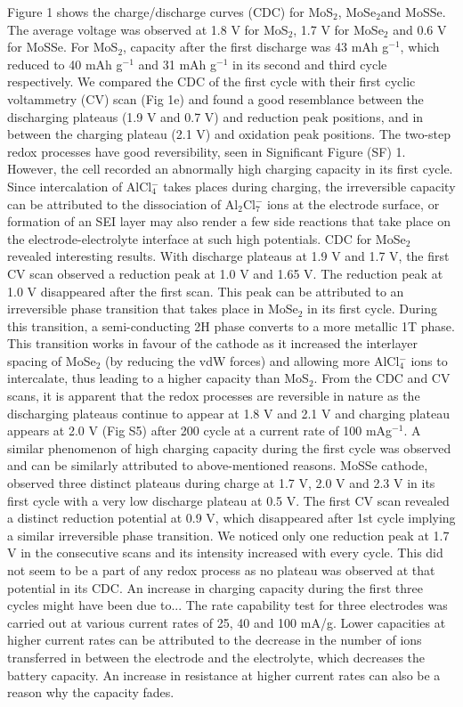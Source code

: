 \documentclass[num-refs]{wiley-article}
\begin{document}
Figure 1 shows the charge/discharge curves (CDC) for MoS$_2$, MoSe$_2$and MoSSe. The average voltage was observed at 1.8 V for MoS$_2$, 1.7 V for MoSe$_2$ and 0.6 V for MoSSe. For MoS$_2$, capacity after the first discharge was 43 mAh g$^{-1}$, which reduced to 40 mAh g$^{-1}$ and 31 mAh g$^{-1}$ in its second and third cycle respectively. We compared the CDC of the first cycle with their first cyclic voltammetry (CV) scan (Fig 1e) and found a good resemblance between the discharging plateaus (1.9 V and 0.7 V) and reduction peak positions, and in between the charging plateau (2.1 V) and oxidation peak positions. The two-step redox processes have good reversibility, seen in Significant Figure (SF) 1. However, the cell recorded an abnormally high charging capacity in its first cycle. Since intercalation of AlCl$_4^-$ takes places during charging, the irreversible capacity can be attributed to the dissociation of Al$_2$Cl$_7^-$ ions at the electrode surface, or formation of an SEI layer may also render a few side reactions that take place on the electrode-electrolyte interface at such high potentials. CDC for MoSe$_2$ revealed interesting results. With discharge plateaus at 1.9 V and 1.7 V, the first CV scan observed a reduction peak at 1.0 V and 1.65 V. The reduction peak at 1.0 V disappeared after the first scan. This peak can be attributed to an irreversible phase transition that takes place in MoSe$_2$ in its first cycle\cite{fan_hybrid_2017}. During this transition, a semi-conducting 2H phase converts to a more metallic 1T phase.  This transition works in favour of the cathode as it increased the interlayer spacing of MoSe$_2$ (by reducing the vdW forces) and allowing more AlCl$_4^-$ ions to intercalate, thus leading to a higher capacity than MoS$_2$. From the CDC and CV scans, it is apparent that the redox processes are reversible in nature as the discharging plateaus continue to appear at 1.8 V and 2.1 V and charging plateau appears at 2.0 V (Fig S5) after 200 cycle at a current rate of 100 mAg$^{-1}$. A similar phenomenon of high charging capacity during the first cycle was observed and can be similarly attributed to above-mentioned reasons. MoSSe cathode, observed three distinct plateaus during charge at 1.7 V, 2.0 V and 2.3 V in its first cycle with a very low discharge plateau at 0.5 V. The first CV scan revealed a distinct reduction potential at 0.9 V, which disappeared after 1st cycle implying a similar irreversible phase transition. We noticed only one reduction peak at 1.7 V in the consecutive scans and its intensity increased with every cycle. This did not seem to be a part of any redox process as no plateau was observed at that potential in its CDC. An increase in charging capacity during the first three cycles might have been due to... The rate capability test for three electrodes was carried out at various current rates of 25, 40 and 100 mA/g. Lower capacities at higher current rates can be attributed to the decrease in the number of ions transferred in between the electrode and the electrolyte, which decreases the battery capacity. An increase in resistance at higher current rates can also be a reason why the capacity fades.
\end{document}
